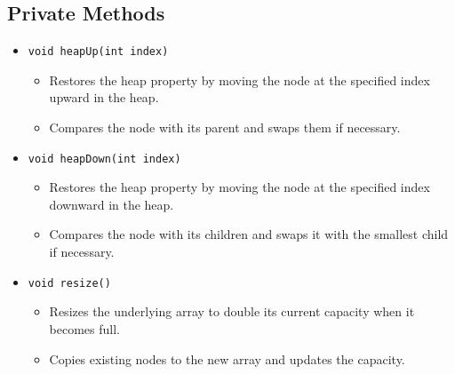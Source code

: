 \documentclass{article}
\begin{document}
\subsection{Private Methods}
\begin{itemize}
    \item \texttt{void heapUp(int index)}
    \begin{itemize}
        \item Restores the heap property by moving the node at the specified index upward in the heap.
        \item Compares the node with its parent and swaps them if necessary.
    \end{itemize}

    \item \texttt{void heapDown(int index)}
    \begin{itemize}
        \item Restores the heap property by moving the node at the specified index downward in the heap.
        \item Compares the node with its children and swaps it with the smallest child if necessary.
    \end{itemize}

    \item \texttt{void resize()}
    \begin{itemize}
        \item Resizes the underlying array to double its current capacity when it becomes full.
        \item Copies existing nodes to the new array and updates the capacity.
    \end{itemize}
\end{itemize}
\end{document}
